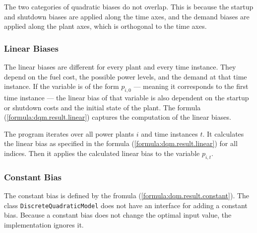 The two categories of quadratic biases do not overlap.
This is because the startup and shutdown biases are applied along the time axes, and the demand biases are applied along the plant axes, which is orthogonal to the time axes.

\subsubsection{Linear Biases}
\label{implementation:annealing.dqm.linear}

The linear biases are different for every plant and every time instance.
They depend on the fuel cost, the possible power levels, and the demand at that time instance.
If the variable is of the form $p_{i, 0}$ --- meaning it corresponds to the first time instance --- the linear bias of that variable is also dependent on the startup or shutdown costs and the initial state of the plant.
The formula (\ref{formula:dqm.result.linear}) captures the computation of the linear biases.

The program iterates over all power plants $i$ and time instances $t$.
It calculates the linear bias as specified in the formula (\ref{formula:dqm.result.linear}) for all indices.
Then it applies the calculated linear bias to the variable $p_{i, t}$.

\subsubsection{Constant Bias}

The constant bias is defined by the fromula (\ref{formula:dqm.result.constant}).
The class \texttt{DiscreteQuadraticModel} does not have an interface for adding a constant bias.
Because a constant bias does not change the optimal input value, the implementation ignores it.
